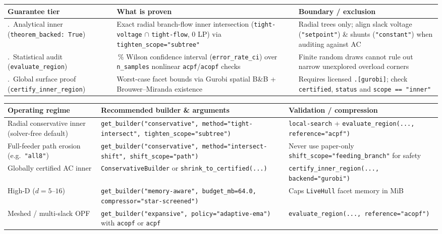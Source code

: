 \documentclass[11pt,a4paper]{report}
\newcommand{\code}[1]{\texttt{\small #1}}
\begin{document}
\begin{center}\small
\begin{tabular}{@{}>{\raggedright\arraybackslash}p{3.5cm}>{\raggedright\arraybackslash}p{5.5cm}>{\raggedright\arraybackslash}p{5.2cm}@{}}
\toprule
\textbf{Guarantee tier} & \textbf{What is proven} & \textbf{Boundary / exclusion} \\
\midrule
1.\ Analytical inner (\code{theorem\_backed: True}) &
  Exact radial branch-flow inner intersection (\code{tight-voltage} $\cap$ \code{tight-flow}, 0 LP) via \code{tighten\_scope="subtree"} &
  Radial trees only; align slack voltage (\code{"setpoint"}) \& shunts (\code{"constant"}) when auditing against AC \\
2.\ Statistical audit (\code{evaluate\_region}) &
  95\,\% Wilson confidence interval (\code{error\_rate\_ci}) over \code{n\_samples} nonlinear \code{acpf}/\code{acopf} checks &
  Finite random draws cannot rule out narrow unexplored overload corners \\
3.\ Global surface proof (\code{certify\_inner\_region}) &
  Worst-case facet bounds via Gurobi spatial B\&B + Brouwer--Miranda existence &
  Requires licensed \code{.[gurobi]}; check \code{certified}, \code{status} and \code{scope == "inner"} \\
\bottomrule
\end{tabular}
\end{center}

\begin{center}\small
\begin{tabular}{@{}>{\raggedright\arraybackslash}p{3.6cm}>{\raggedright\arraybackslash}p{5.8cm}>{\raggedright\arraybackslash}p{4.8cm}@{}}
\toprule
\textbf{Operating regime} & \textbf{Recommended builder \& arguments} & \textbf{Validation / compression} \\
\midrule
Radial conservative inner (solver-free default) &
  \code{get\_builder("conservative", method="tight-intersect", tighten\_scope="subtree")} &
  \code{local-search} + \code{evaluate\_region(..., reference="acpf")} \\
Full-feeder path erosion (e.g.\ \code{"all8"}) &
  \code{get\_builder("conservative", method="intersect-shift", shift\_scope="path")} &
  Never use paper-only \code{shift\_scope="feeding\_branch"} for safety \\
Globally certified AC inner &
  \code{ConservativeBuilder} or \code{shrink\_to\_certified(...)} &
  \code{certify\_inner\_region(..., backend="gurobi")} \\
High-D ($d = 5\text{--}16$) &
  \code{get\_builder("memory-aware", budget\_mb=64.0, compressor="star-screened")} &
  Caps \code{LiveHull} facet memory in MiB \\
Meshed / multi-slack OPF &
  \code{get\_builder("expansive", policy="adaptive-ema")} with \code{acopf} or \code{acpf} &
  \code{evaluate\_region(..., reference="acopf")} \\
\bottomrule
\end{tabular}
\end{center}
\end{document}
